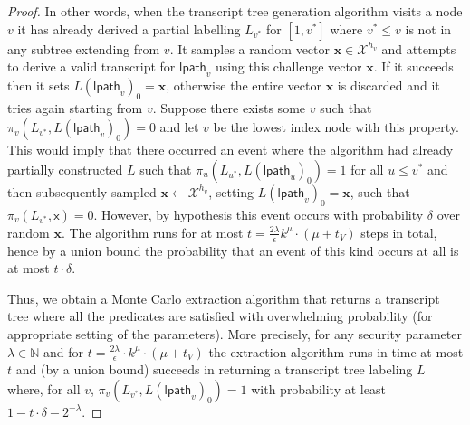 \documentclass{article}
\theoremstyle{definition}
\begin{document}
\begin{proof}
In other words, when the transcript tree generation algorithm visits a node $v$ it has already derived a partial labelling $L_{v^*}$ for $[1,v^*]$ where $v^* ≤ v$ is not in any subtree extending from $v$. It samples a random vector $\mathbf{x} \in \mathcal{X}^{h_v}$ and attempts to derive a valid transcript for $\mathsf{lpath}_v$ using this challenge vector $\mathbf{x}$. If it succeeds then it sets $L(\mathsf{lpath}_v)_0 = \mathbf{x}$, otherwise the entire vector $\mathbf{x}$ is discarded and it tries again starting from $v$. Suppose there exists some $v$ such that $\pi_v(L_{v^*}, L(\mathsf{lpath}_v)_0) = 0$ and let $v$ be the lowest index node with this property.  This would imply that there occurred an event where the algorithm had already partially constructed $L$ such that $\pi_u(L_{u^*}, L(\mathsf{lpath}_u)_0) = 1$ for all $u \leq v^*$ and then subsequently sampled $\mathbf{x} \leftarrow \mathcal{X}^{h_v}$, setting $L(\mathsf{lpath}_v)_0 = \mathbf{x}$, such that $\pi_v(L_{v^*}, \mathsf{x}) = 0$. However, by hypothesis this event occurs with probability $\delta$ over random $\mathbf{x}$. The algorithm runs for at most $t = \frac{2\lambda}{\epsilon} k^\mu \cdot (\mu + t_V)$ steps in total, hence by a union bound the probability that an event of this kind occurs at all is at most $t \cdot \delta$. 

Thus, we obtain a Monte Carlo extraction algorithm that returns a transcript tree where all the predicates are satisfied with overwhelming probability (for appropriate setting of the parameters). More precisely, for any security parameter $\lambda \in \mathbb{N}$ and for $t = \frac{2\lambda}{\epsilon} \cdot k^\mu \cdot (\mu + t_V)$ the extraction algorithm runs in time at most $t$ and (by a union bound) succeeds in returning a transcript tree labeling $L$ where, for all $v$, $\pi_v(L_{v^*}, L(\mathsf{lpath}_v)_0) = 1$ with probability at least  $1 - t\cdot \delta - 2^{-\lambda}$.   %


 \end{proof}

 
\end{document}
